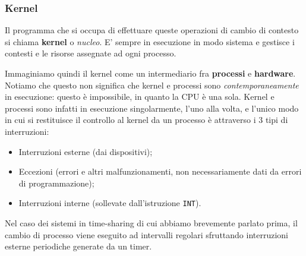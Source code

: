 \documentclass[a4paper,11pt]{article}
\begin{document}
\subsubsection{Kernel}
Il programma che si occupa di effettuare queste operazioni di cambio di contesto si chiama \textbf{kernel} o \textit{nucleo}.
E' sempre in esecuzione in modo sistema e gestisce i contesti e le risorse assegnate ad ogni processo.

Immaginiamo quindi il kernel come un intermediario fra \textbf{processi} e \textbf{hardware}.
Notiamo che questo non significa che kernel e processi sono \textit{contemporaneamente} in esecuzione: questo è impossibile, in quanto la CPU è una sola.
Kernel e processi sono infatti in esecuzione singolarmente, l'uno alla volta, e l'unico modo in cui si restituisce il controllo al kernel da un processo è attraverso i 3 tipi di interruzioni:
\begin{itemize}
	\item Interruzioni esterne (dai dispositivi);
	\item Eccezioni (errori e altri malfunzionamenti, non necessariamente dati da errori di programmazione);
	\item Interruzioni interne (sollevate dall'istruzione \lstinline|INT|).
\end{itemize}

Nel caso dei sistemi in time-sharing di cui abbiamo brevemente parlato prima, il cambio di processo viene eseguito ad intervalli regolari sfruttando interruzioni esterne periodiche generate da un timer. 
\end{document}
